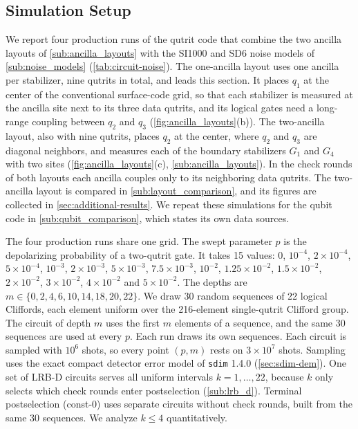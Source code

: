 
\subsection{Simulation Setup}
\label{sub:results_setup}

We report four production runs of the qutrit code that combine the two ancilla layouts of \autoref{sub:ancilla_layouts} with the SI1000 and SD6 noise models of \autoref{sub:noise_models} (\autoref{tab:circuit-noise}). The one-ancilla layout uses one ancilla per stabilizer, nine qutrits in total, and leads this section.
It places $q_1$ at the center of the conventional surface-code grid, so that each stabilizer is measured at the ancilla site next to its three data qutrits, and its logical gates need a long-range coupling between $q_2$ and $q_3$ (\autoref{fig:ancilla_layouts}(b)). The two-ancilla layout, also with nine qutrits, places $q_2$ at the center, where $q_2$ and $q_3$ are diagonal neighbors, and measures each of the boundary stabilizers $G_1$ and $G_4$ with two sites (\autoref{fig:ancilla_layouts}(c), \autoref{sub:ancilla_layouts}). In the check rounds of both layouts each ancilla couples only to its neighboring data qutrits. The two-ancilla layout is compared in \autoref{sub:layout_comparison}, and its figures are collected in \autoref{sec:additional-results}. We repeat these simulations for the qubit code in \autoref{sub:qubit_comparison}, which states its own data sources.

The four production runs share one grid. The swept parameter $p$ is the depolarizing probability of a two-qutrit gate. It takes 15 values: $0$, $10^{-4}$, $2\times10^{-4}$, $5\times10^{-4}$, $10^{-3}$, $2\times10^{-3}$, $5\times10^{-3}$, $7.5\times10^{-3}$, $10^{-2}$, $1.25\times10^{-2}$, $1.5\times10^{-2}$, $2\times10^{-2}$, $3\times10^{-2}$, $4\times10^{-2}$ and $5\times10^{-2}$. The depths are $m \in \{0, 2, 4, 6, 10, 14, 18, 20, 22\}$. We draw 30 random sequences of 22 logical Cliffords, each element uniform over the 216-element single-qutrit Clifford group. The circuit of depth $m$ uses the first $m$ elements of a sequence, and the same 30 sequences are used at every $p$. Each run draws its own sequences. Each circuit is sampled with $10^6$ shots, so every point $(p, m)$ rests on $3\times10^7$ shots. Sampling uses the exact compact detector error model of \texttt{sdim} 1.4.0 (\autoref{sec:sdim-dem}). One set of LRB-D circuits serves all uniform intervals $k = 1, \dots, 22$, because $k$ only selects which check rounds enter postselection (\autoref{sub:lrb_d}). Terminal postselection (const-0) uses separate circuits without check rounds, built from the same 30 sequences. We analyze $k \le 4$ quantitatively.

